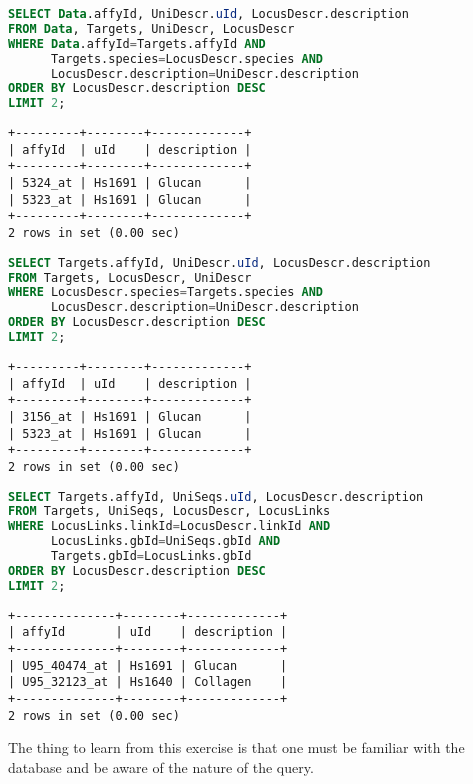 \begin{lstlisting}[language=sql]
SELECT Data.affyId, UniDescr.uId, LocusDescr.description
FROM Data, Targets, UniDescr, LocusDescr
WHERE Data.affyId=Targets.affyId AND
      Targets.species=LocusDescr.species AND
      LocusDescr.description=UniDescr.description
ORDER BY LocusDescr.description DESC
LIMIT 2;
\end{lstlisting}

\begin{lstlisting}[style=output]
+---------+--------+-------------+
| affyId  | uId    | description |
+---------+--------+-------------+
| 5324_at | Hs1691 | Glucan      |
| 5323_at | Hs1691 | Glucan      |
+---------+--------+-------------+
2 rows in set (0.00 sec)
\end{lstlisting}

\begin{lstlisting}[language=sql]
SELECT Targets.affyId, UniDescr.uId, LocusDescr.description
FROM Targets, LocusDescr, UniDescr
WHERE LocusDescr.species=Targets.species AND
      LocusDescr.description=UniDescr.description
ORDER BY LocusDescr.description DESC
LIMIT 2;
\end{lstlisting}

\begin{lstlisting}[style=output]
+---------+--------+-------------+
| affyId  | uId    | description |
+---------+--------+-------------+
| 3156_at | Hs1691 | Glucan      |
| 5323_at | Hs1691 | Glucan      |
+---------+--------+-------------+
2 rows in set (0.00 sec)
\end{lstlisting}

\begin{lstlisting}[language=sql]
SELECT Targets.affyId, UniSeqs.uId, LocusDescr.description
FROM Targets, UniSeqs, LocusDescr, LocusLinks
WHERE LocusLinks.linkId=LocusDescr.linkId AND
      LocusLinks.gbId=UniSeqs.gbId AND
      Targets.gbId=LocusLinks.gbId
ORDER BY LocusDescr.description DESC
LIMIT 2;
\end{lstlisting}

\begin{lstlisting}[style=output]
+--------------+--------+-------------+
| affyId       | uId    | description |
+--------------+--------+-------------+
| U95_40474_at | Hs1691 | Glucan      |
| U95_32123_at | Hs1640 | Collagen    |
+--------------+--------+-------------+
2 rows in set (0.00 sec)
\end{lstlisting}

The thing to learn from this exercise is that one must be familiar with the database and be aware of the nature of the query.

